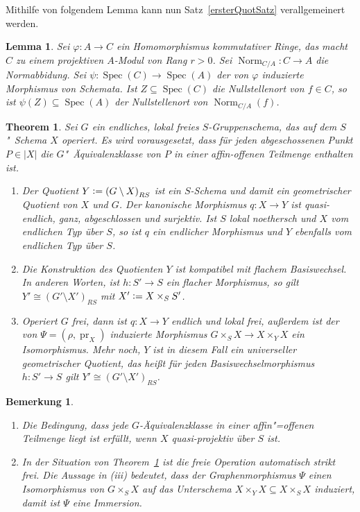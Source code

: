\documentclass[DIV11,11pt]{scrartcl}
\theoremstyle{Definitionen}
\newtheorem{Bem}[Def]{Bemerkung}
\theoremstyle{Aussagen}
\newtheorem{Thm}[Def]{Theorem}
\newtheorem{Lem}[Def]{Lemma}
\newcommand{\coloneq}{\ensuremath{\mathrel{\mathop{\raisebox{0.5pt}{:}}}=}}
\let\phi\varphi
\DeclareMathOperator{\Norm}{Norm}
\DeclareMathOperator{\pr}{pr}
\DeclareMathOperator{\Spec}{Spec}
\begin{document}
Mithilfe von folgendem Lemma kann nun Satz~\ref{ersterQuotSatz} verallgemeinert werden.

\begin{Lem}
Sei $\phi\colon A\rightarrow C$ ein Homomorphismus kommutativer Ringe, das macht $C$ zu einem projektiven $A$-Modul von Rang $r>0$. Sei $\Norm_{C/A}\colon C\rightarrow A$
die \textit{Normabbidung}. Sei $\psi\colon\Spec(C)\rightarrow\Spec(A)$ der von $\phi$ induzierte Morphismus von Schemata. Ist $Z\subseteq\Spec(C)$ die Nullstellenort von $f\in C$, so ist $\psi(Z)\subseteq\Spec(A)$ der Nullstellenort von $\Norm_{C/A}(f)$.
\end{Lem}

\begin{Thm}\label{Theorem}
Sei $G$ ein endliches, lokal freies $S$-Gruppenschema, das auf dem $S$"~Schema $X$ operiert. Es wird vorausgesetzt, dass für jeden abgeschossenen Punkt $P\in\left| X \right|$ die $G$"~Äqui\-valenzklasse von $P$ in einer affin-offenen Teilmenge enthalten ist.
\begin{enumerate}
\item Der Quotient $Y\coloneq\left(G\setminus X\right)_{RS}$ ist ein $S$-Schema und damit ein geometrischer Quotient von $X$ und $G$. Der kanonische Morphismus $q\colon X\rightarrow Y$ ist quasi-endlich, ganz, abgeschlossen und surjektiv. Ist $S$ lokal noethersch und $X$ vom endlichen Typ über $S$, so ist $q$ ein endlicher Morphismus und $Y$ ebenfalls vom endlichen Typ über $S$.
\item Die Konstruktion des Quotienten $Y$ ist kompatibel mit flachem Basiswechsel. In anderen Worten, ist $h\colon S'\rightarrow S$ ein flacher Morphismus, so gilt $Y'\cong\left(G'\setminus X'\right)_{RS}$ mit $X'\coloneq X\times_S S'$.
\item Operiert $G$ frei, dann ist $q\colon X\rightarrow Y$ endlich und lokal frei, außerdem ist der von $\Psi=(\rho,\pr_X)$ induzierte Morphismus $G\times_S X\rightarrow X\times_Y X$ ein Isomorphismus. Mehr noch, $Y$ ist in diesem Fall ein universeller geometrischer Quotient, das heißt für jeden Basiswechselmorphismus $h\colon S'\rightarrow S$ gilt $Y'\cong\left(G'\setminus X'\right)_{RS}$.
\end{enumerate} 
\end{Thm}

\begin{Bem}
\begin{enumerate}
\item Die Bedingung, dass jede $G$-Äquivalenzklasse in einer affin"=offenen Teilmenge liegt ist erfüllt, wenn $X$ quasi-projektiv über $S$ ist.
\item In der Situation von Theorem~\ref{Theorem} ist die freie Operation automatisch strikt frei. Die Aussage in (iii) bedeutet, dass der Graphenmorphismus $\Psi$ einen Isomorphismus von $G\times_S X$ auf das Unterschema $X\times_Y X\subseteq X\times_S X$ induziert, damit ist $\Psi$ eine Immersion.
\end{enumerate}
\end{Bem}
\end{document}
